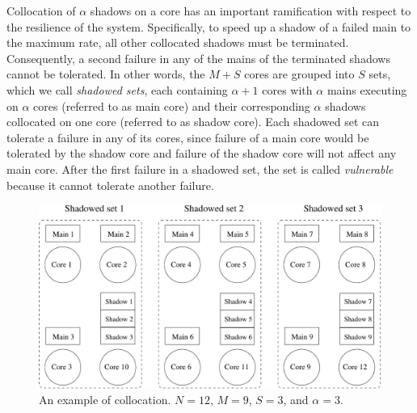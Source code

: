 Collocation of $\alpha$ shadows on a core has an important ramification with respect to the resilience of the system. Specifically, to speed up a shadow 
of a failed main to the maximum rate, all other collocated shadows must be terminated. Consequently, a second failure in any of the mains of the terminated shadows cannot be tolerated. In other words, the $M+S$ cores are grouped into $S$ sets, which we call \emph{shadowed sets}, each containing $\alpha+1$ cores with $\alpha$ mains executing on $\alpha$ cores (referred to as main core) and their corresponding $\alpha$ shadows collocated on one core (referred to as shadow core). Each shadowed set can tolerate a failure in any of its cores, since failure of a main core would be tolerated by the shadow core and failure of the shadow core will not affect any main core. After the first failure in a shadowed set, the set is called \emph{vulnerable} because it cannot tolerate another failure. %

\begin{figure}[!t]
  \begin{center}
    \includegraphics[width=\columnwidth]{Figures/sc_mapping.pdf}
  \end{center}
  \caption{An example of collocation. $N=12$, $M=9$, $S=3$, and $\alpha=3$.}
  \label{fig:sc_mapping}
\end{figure}





